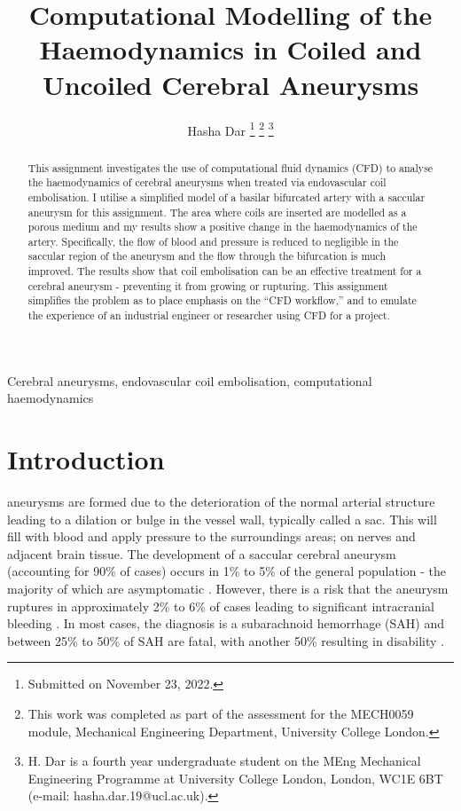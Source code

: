 \documentclass[journal,twoside,web]{ieeecolor}
\begin{document}
\title{Computational Modelling of the Haemodynamics in Coiled and Uncoiled Cerebral Aneurysms}
\author{Hasha Dar
    \thanks{Submitted on November 23, 2022.}
    \thanks{This work was completed as part of the assessment for the MECH0059 module, Mechanical Engineering Department, University College London. }
    \thanks{H. Dar is a fourth year undergraduate student on the MEng Mechanical Engineering Programme at University College London, London, WC1E 6BT (e-mail: hasha.dar.19@ucl.ac.uk). }}

\maketitle

\begin{abstract}
    This assignment investigates the use of computational fluid dynamics (CFD) to analyse the haemodynamics of cerebral aneurysms when treated via endovascular coil embolisation. I utilise a simplified model of a basilar bifurcated artery with a saccular aneurysm for this assignment. The area where coils are inserted are modelled as a porous medium and my results show a positive change in the haemodynamics of the artery. Specifically, the flow of blood and pressure is reduced to negligible in the saccular region of the aneurysm and the flow through the bifurcation is much improved. The results show that coil embolisation can be an effective treatment for a cerebral aneurysm - preventing it from growing or rupturing. This assignment simplifies the problem as to place emphasis on the ``CFD workflow,'' and to emulate the experience of an industrial engineer or researcher using CFD for a project.
\end{abstract}

\begin{IEEEkeywords}
    Cerebral aneurysms, endovascular coil embolisation, computational haemodynamics
\end{IEEEkeywords}

\section{Introduction}
 aneurysms are formed due to the deterioration of the normal arterial structure leading to a dilation or bulge in the vessel wall, typically called a sac. This will fill with blood and apply pressure to the surroundings areas; on nerves and adjacent brain tissue. The development of a saccular cerebral aneurysm (accounting for 90\% of cases) occurs in 1\% to 5\% of the general population - the majority of which are asymptomatic \cite{doi:10.1161/STROKEAHA.113.002390}. However, there is a risk that the aneurysm ruptures in approximately 2\% to 6\% of cases leading to significant intracranial bleeding \cite{doi:10.1161/01.STR.29.1.251}. In most cases, the diagnosis is a subarachnoid hemorrhage (SAH) and between 25\% to 50\% of SAH are fatal, with another 50\% resulting in disability \cite{intracranialAneurysms}.
\end{document}
